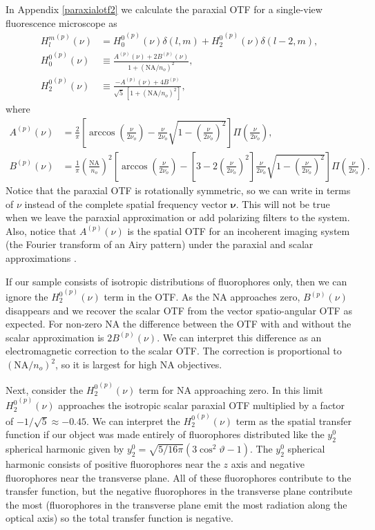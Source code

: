 \documentclass[11pt]{article}
\providecommand{\bs}[1]{\boldsymbol{#1}}
\begin{document}
In Appendix \ref{paraxialotf2} we calculate the paraxial OTF for a single-view
fluorescence microscope as
\begin{align}
  {H_l^m}^{(p)}(\nu) &= {H_0^0}^{(p)}(\nu)\delta(l, m) + {H_2^0}^{(p)}(\nu)\delta(l-2, m), \label{eq:fullotf} \\
  {H_0^0}^{(p)}(\nu) &\equiv \frac{A^{(p)}(\nu) + 2B^{(p)}(\nu)}{1 + (\text{NA}/n_o)^2},\\
  {H_2^0}^{(p)}(\nu) &\equiv \frac{-A^{(p)}(\nu) + 4B^{(p)}}{\sqrt{5}\, [1 + (\text{NA}/n_o)^2]},
\end{align}
where
\begin{align}
  {A}^{(p)}(\nu) &= \frac{2}{\pi}\left[\arccos\left(\frac{\nu}{2\nu_o}\right) - \frac{\nu}{2\nu_o}\sqrt{1 - \left(\frac{\nu}{2\nu_o}\right)^2}\right]\Pi\left(\frac{\nu}{2\nu_o}\right),\\
  B^{(p)}(\nu) &= \frac{1}{\pi}\left(\frac{\text{NA}}{n_o}\right)^2\left[\arccos\left(\frac{\nu}{2\nu_o}\right) - \left[3 - 2\left(\frac{\nu}{2\nu_o}\right)^2\right]\frac{\nu}{2\nu_o} \sqrt{1 - \left(\frac{\nu}{2\nu_o}\right)^2}\right]\Pi\left(\frac{\nu}{2\nu_o}\right).                 
\end{align}
Notice that the paraxial OTF is rotationally symmetric, so we can write in terms
of $\nu$ instead of the complete spatial frequency vector $\bs{\nu}$. This will
not be true when we leave the paraxial approximation or add polarizing filters
to the system. Also, notice that ${A}^{(p)}(\nu)$ is the spatial OTF for an
incoherent imaging system (the Fourier transform of an Airy pattern) under the
paraxial and scalar approximations \cite{goodman1996}.

If our sample consists of isotropic distributions of fluorophores only, then we
can ignore the ${H_2^0}^{(p)}(\nu)$ term in the OTF. As the NA approaches zero,
${B}^{(p)}(\nu)$ disappears and we recover the scalar OTF from the vector
spatio-angular OTF as expected. For non-zero NA the difference between the OTF
with and without the scalar approximation is $2{B}^{(p)}(\nu)$. We can interpret
this difference as an electromagnetic correction to the scalar OTF. The
correction is proportional to $\left(\text{NA}/{n_o}\right)^2$, so it is largest
for high NA objectives.

Next, consider the ${H_2^0}^{(p)}(\nu)$ term for NA approaching zero. In this
limit ${H_2^0}^{(p)}(\nu)$ approaches the isotropic scalar paraxial OTF
multiplied by a factor of $-1/\sqrt{5} \approx -0.45$. We can interpret the
${H_2^0}^{(p)}(\nu)$ term as the spatial transfer function if our object was
made entirely of fluorophores distributed like the $y_2^0$ spherical harmonic
given by $y_2^0 = \sqrt{5/16\pi}(3\cos^2\vartheta -1)$. The $y_2^0$ spherical
harmonic consists of positive fluorophores near the $z$ axis and negative
fluorophores near the transverse plane. All of these fluorophores contribute to
the transfer function, but the negative fluorophores in the transverse plane
contribute the most (fluorophores in the transverse plane emit the most
radiation along the optical axis) so the total transfer function is negative.
\end{document}
